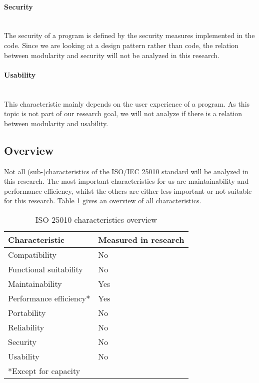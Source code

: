\documentclass[twoside]{uva-inf-bachelor-thesis}
\newcommand{\myparagraph}[1]{\paragraph{#1}\mbox{}\\}
\begin{document}
\myparagraph{Security}
The security of a program is defined by the security measures implemented in the code. Since we are looking at a design pattern rather than code, the relation between modularity and security will not be analyzed in this research.

\myparagraph{Usability}
This characteristic mainly depends on the user experience of a program. As this topic is not part of our research goal, we will not analyze if there is a relation between modularity and usability.

\subsection{Overview}
Not all (sub-)characteristics of the ISO/IEC 25010 standard will be analyzed in this research. The most important characteristics for us are maintainability and performance efficiency, whilst the others are either less important or not suitable for this research. Table \ref{table:overview} gives an overview of all characteristics.

\begin{table}[H]
\centering
\caption{ISO 25010 characteristics overview}
\label{table:overview}
\begin{tabular}{ll}
\multicolumn{1}{l|}{\textbf{Characteristic}} & \textbf{Measured in research} \\ \hline
\multicolumn{1}{l|}{Compatibility}           & No                            \\
\multicolumn{1}{l|}{Functional suitability}  & No                            \\
\multicolumn{1}{l|}{Maintainability}         & Yes                           \\
\multicolumn{1}{l|}{Performance efficiency*} & Yes                           \\
\multicolumn{1}{l|}{Portability}             & No                            \\
\multicolumn{1}{l|}{Reliability}             & No                            \\
\multicolumn{1}{l|}{Security}                & No                            \\
\multicolumn{1}{l|}{Usability}               & No                            \\
*Except for capacity                         &                              
\end{tabular}
\end{table}
\end{document}
